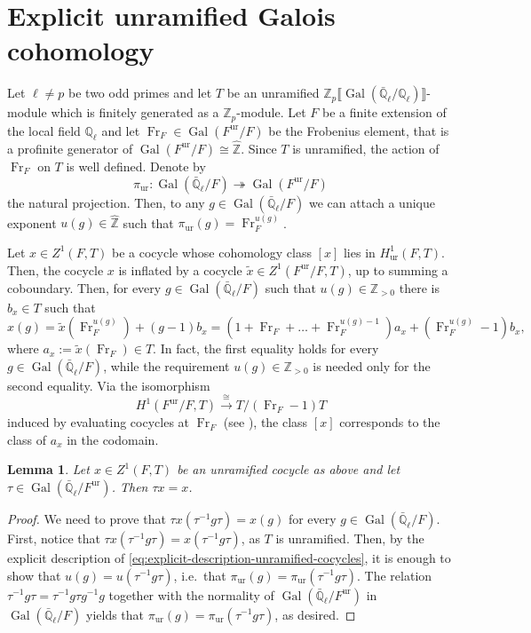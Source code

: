 \documentclass[12pt,reqno]{amsart}
\newtheorem{lemma}[theorem]{Lemma}
\theoremstyle{definition}
\theoremstyle{remark}
\newcommand{\numberset}{\mathbb}
\newcommand{\Q}{\numberset{Q}}
\newcommand{\Z}{\numberset{Z}}
\DeclareMathOperator{\Gal}{Gal}
\DeclareMathOperator{\Fr}{Fr}
\newcommand{\ur}{\mathrm{ur}}
\newcommand{\gt}{\tau}
\begin{document}
\section{Explicit unramified Galois cohomology}\label{app:unramified-Galois-cohomology}

Let $\ell\ne p$ be two odd primes and let $T$ be an unramified $\Z_p\llbracket \Gal(\bar{\Q}_\ell/\Q_\ell)\rrbracket$-module which is finitely generated as a $\Z_p$-module. Let $F$ be a finite extension of the local field $\Q_\ell$ and let  $\Fr_F\in\Gal(F^{\ur}/F)$ be the Frobenius element, that is a profinite generator of $\Gal(F^{\ur}/F)\cong\hat{\Z}$. Since $T$ is unramified, the action of $\Fr_F$ on $T$ is well defined. Denote by
\begin{equation*}
    \pi_{\ur}\colon \Gal(\bar{\Q}_\ell/F)\twoheadrightarrow \Gal(F^{\ur}/F)
\end{equation*}
the natural projection. Then, to any $g\in \Gal(\bar{\Q}_\ell/F)$ we can attach a unique exponent $u(g)\in\hat{\Z}$ such that $\pi_{\ur}(g)=\Fr_F^{u(g)}$.

Let $x\in Z^1(F,T)$ be a cocycle whose cohomology class $[x]$ lies in $H^1_{\ur}(F,T)$. Then, the cocycle $x$ is inflated by a cocycle $\tilde{x}\in Z^1(F^{\ur}/F,T)$, up to summing a coboundary. Then, for every $g\in \Gal(\bar{\Q}_\ell/F)$ such that $u(g)\in\Z_{>0}$ there is $b_x\in T$ such that
\begin{equation}\label{eq:explicit-description-unramified-cocycles}
    x(g)=\tilde{x}(\Fr_F^{u(g)})+(g-1)b_x=(1+\Fr_F+\dots+\Fr_F^{u(g)-1})a_x+(\Fr_F^{u(g)}-1)b_x,
\end{equation}
where $a_x:=\tilde{x}(\Fr_F)\in T$. In fact, the first equality holds for every $g\in \Gal(\bar{\Q}_\ell/F)$, while the requirement $u(g)\in\Z_{>0}$ is needed only for the second equality. Via the isomorphism 
\begin{equation*}
    H^1(F^{\ur}/F,T)\overset{\cong}{\longrightarrow}T/(\Fr_F-1)T
\end{equation*}
induced by evaluating cocycles at $\Fr_F$ (see \cite[Lemma B.2.8]{Rubin00:euler-systems}), the class $[x]$ corresponds to the class of $a_x$ in the codomain.

\begin{lemma}\label{lem:app-unramified-cocycles}
    Let $x\in Z^1(F,T)$ be an unramified cocycle as above and let $\tau\in \Gal(\bar{\Q}_\ell/F^{\ur})$. Then $\gt x=x$.
\end{lemma}
\begin{proof}
    We need to prove that $\gt x(\gt^{-1} g\gt)=x(g)$ for every $g\in \Gal(\bar{\Q}_\ell/F)$. First, notice that $\gt x(\gt^{-1} g\gt)=x(\gt^{-1} g\gt)$, as $T$ is unramified. Then, by the explicit description of \eqref{eq:explicit-description-unramified-cocycles}, it is enough to show that $u(g)=u(\gt^{-1} g\gt)$, i.e.~that $\pi_{\ur}(g)=\pi_{\ur}(\gt^{-1} g\gt)$. The relation $\gt^{-1} g\gt=\gt^{-1} g\gt g^{-1} g$ together with the normality of $\Gal(\bar{\Q}_\ell/F^{\ur})$ in $\Gal(\bar{\Q}_\ell/F)$ yields that $\pi_{\ur}(g)=\pi_{\ur}(\gt^{-1} g\gt)$, as desired.
\end{proof}
\end{document}
